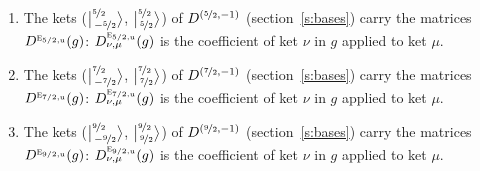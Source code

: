 \documentclass[10pt,a4paper]{article}
\numberwithin{equation}{section}
\newcommand{\irr}[1]{\text{\normalfont\scshape #1}}
\newcommand{\ptag}[1]{\mathrm{#1}}
\newcommand{\irrJp}[2]{D^{(#1,#2)}}
\newcommand{\repD}[1]{D^{#1}}
\newcommand{\intx}{\mu}
\newcommand{\jm}[2]{\bigl\lvert{}^{#1}_{\,#2}\bigr\rangle}
\newenvironment{romanlist}{\begin{enumerate}%
\renewcommand{\labelenumi}{(\roman{enumi})}}%
  {\end{enumerate}}
\begin{document}
\begin{romanlist}
\item The kets ($\jm{\nicefrac{5}{2}}{-\nicefrac{5}{2}}$, $\jm{\nicefrac{5}{2}}{\nicefrac{5}{2}}$) of $\irrJp{\nicefrac{5}{2}}{-1}$ (section~\ref{s:bases}) carry the matrices $\repD{\irr{e}_{5/2,\ptag{u}}}(g)$: $\repD{\irr{e}_{5/2,\ptag{u}}}_{\nu,\intx}(g)$ is the coefficient of ket $\nu$ in $g$ applied to ket $\intx$.
\item The kets ($\jm{\nicefrac{7}{2}}{-\nicefrac{7}{2}}$, $\jm{\nicefrac{7}{2}}{\nicefrac{7}{2}}$) of $\irrJp{\nicefrac{7}{2}}{-1}$ (section~\ref{s:bases}) carry the matrices $\repD{\irr{e}_{7/2,\ptag{u}}}(g)$: $\repD{\irr{e}_{7/2,\ptag{u}}}_{\nu,\intx}(g)$ is the coefficient of ket $\nu$ in $g$ applied to ket $\intx$.
\item The kets ($\jm{\nicefrac{9}{2}}{-\nicefrac{9}{2}}$, $\jm{\nicefrac{9}{2}}{\nicefrac{9}{2}}$) of $\irrJp{\nicefrac{9}{2}}{-1}$ (section~\ref{s:bases}) carry the matrices $\repD{\irr{e}_{9/2,\ptag{u}}}(g)$: $\repD{\irr{e}_{9/2,\ptag{u}}}_{\nu,\intx}(g)$ is the coefficient of ket $\nu$ in $g$ applied to ket $\intx$.
\end{romanlist}
\end{document}
